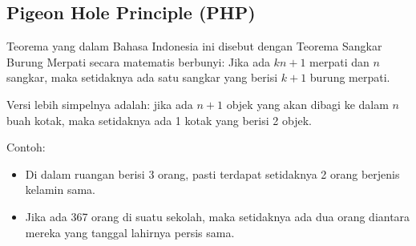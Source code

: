 \subsection{Pigeon Hole Principle (PHP)}
Teorema yang dalam Bahasa Indonesia ini disebut dengan Teorema Sangkar Burung Merpati secara matematis berbunyi:
Jika ada $kn+1$ merpati dan $n$ sangkar, maka setidaknya ada satu sangkar yang berisi $k+1$ burung merpati.

Versi lebih simpelnya adalah: jika ada $n+1$ objek yang akan dibagi ke dalam $n$ buah kotak, maka setidaknya ada 1 kotak yang berisi 2 objek.

Contoh: \begin{itemize}
    \item Di dalam ruangan berisi 3 orang, pasti terdapat setidaknya 2 orang berjenis kelamin sama.
    \item Jika ada 367 orang di suatu sekolah, maka setidaknya ada dua orang diantara mereka yang tanggal lahirnya persis sama.
\end{itemize}

